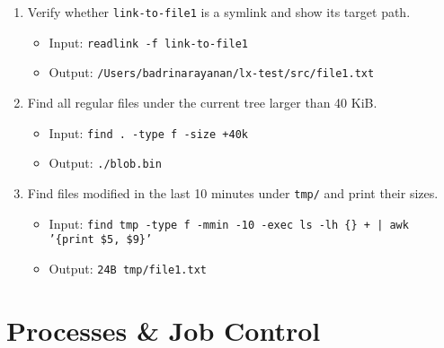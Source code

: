 \begin{enumerate}
\item Verify whether \texttt{link-to-file1} is a symlink and show its target path.
\begin{itemize}
\item Input: \texttt{readlink -f link-to-file1}
\item Output: \texttt{/Users/badrinarayanan/lx-test/src/file1.txt}
\end{itemize}

\item Find all regular files under the current tree larger than 40 KiB.
\begin{itemize}
\item Input: \texttt{find . -type f -size +40k}
\item Output: \texttt{./blob.bin}
\end{itemize}

\item Find files modified in the last 10 minutes under \texttt{tmp/} and print their sizes.
\begin{itemize}
\item Input: \texttt{find tmp -type f -mmin -10 -exec ls -lh \{\} + | awk '\{print \$5, \$9\}'}
\item Output: \texttt{24B tmp/file1.txt}
\end{itemize}
\end{enumerate}

\section{Processes \& Job Control}

